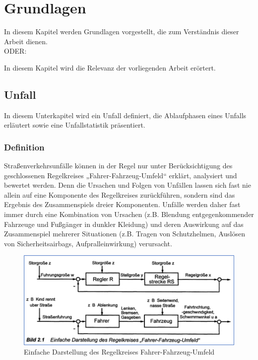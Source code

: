 \chapter{Grundlagen}
In diesem Kapitel werden Grundlagen vorgestellt, die zum Verständnis dieser Arbeit dienen.\\
ODER:

In diesem Kapitel wird die Relevanz der vorliegenden Arbeit erörtert.




%
%
\section{Unfall}
In diesem Unterkapitel wird ein Unfall definiert, die Ablaufphasen eines Unfalls erläutert sowie eine Unfallstatistik präsentiert.
%
%
%
%
\subsection{Definition}
Straßenverkehrsunfälle können in der Regel nur unter Berücksichtigung des geschlossenen Regelkreises „Fahrer-Fahrzeug-Umfeld“ erklärt, analysiert und bewertet werden. Denn die Ursachen und Folgen von Unfällen lassen sich fast nie allein auf eine Komponente des Regelkreises zurückführen, sondern sind das Ergebnis des Zusammenspiels dreier Komponenten. Unfälle werden daher fast immer durch eine Kombination von Ursachen (z.B. Blendung entgegenkommender Fahrzeuge und Fußgänger in dunkler Kleidung) und deren Auswirkung auf das Zusammenspiel mehrerer Situationen (z.B. Tragen von Schutzhelmen, Auslösen von Sicherheitsairbags, Aufpralleinwirkung) verursacht. \citep{Appel2002}

\begin{figure}[H]
	\centering
	\includegraphics[width=\linewidth]{Bilder/FahrenRegelkreis.png}
	\caption{Einfache Darstellung des Regelkreises 	\glqq Fahrer-Fahrzeug-Umfeld\grqq{} \citep{Appel2002}} %
	\label{fig:FahrenRegelkreis}
\end{figure}

